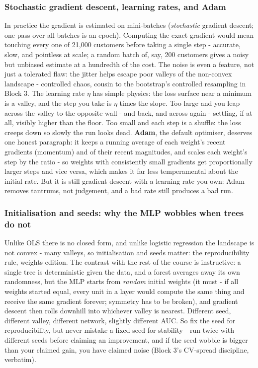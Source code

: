 \documentclass[11pt,a4paper]{article}
\begin{document}
\subsubsection{Stochastic gradient descent, learning rates, and Adam}
In practice the gradient is estimated on mini-batches
(\emph{stochastic} gradient descent; one pass over all batches is an
epoch). Computing the exact gradient would mean touching every one of
21{,}000 customers before taking a single step - accurate, slow, and
pointless at scale; a random batch of, say, 200 customers gives a noisy
but unbiased estimate at a hundredth of the cost. The noise is even a
feature, not just a tolerated flaw: the jitter helps escape poor
valleys of the non-convex landscape - controlled chaos, cousin to the
bootstrap's controlled resampling in Block 3. The learning rate $\eta$
has simple physics: the loss surface near a minimum is a valley, and
the step you take is $\eta$ times the slope. Too large and you leap
across the valley to the opposite wall - and back, and across again -
settling, if at all, visibly higher than the floor. Too small and each
step is a shuffle: the loss creeps down so slowly the run looks dead.
\textbf{Adam}, the default optimiser, deserves one honest
paragraph: it keeps a running average of each weight's recent gradients
(momentum) and of their recent magnitudes, and scales each weight's
step by the ratio - so weights with consistently small gradients get
proportionally larger steps and vice versa, which makes it far less
temperamental about the initial rate. But it is still gradient descent
with a learning rate you own: Adam removes tantrums, not judgement, and
a bad rate still produces a bad run.

\subsubsection{Initialisation and seeds: why the MLP wobbles when trees
do not}
Unlike OLS there is no closed form, and unlike logistic regression the
landscape is not convex - many valleys, so initialisation and seeds
matter: the reproducibility rule, weights edition. The contrast with the
rest of the course is instructive: a single tree is deterministic given
the data, and a forest averages away its own randomness, but the MLP
starts from \emph{random} initial weights (it must - if all weights
started equal, every unit in a layer would compute the same thing and
receive the same gradient forever; symmetry has to be broken), and
gradient descent then rolls downhill into whichever valley is nearest.
Different seed, different valley, different network, slightly different
AUC. So fix the seed for reproducibility, but never mistake a fixed
seed for stability - run twice with different seeds before claiming an
improvement, and if the seed wobble is bigger than your claimed gain,
you have claimed noise (Block 3's CV-spread discipline, verbatim).
\end{document}
